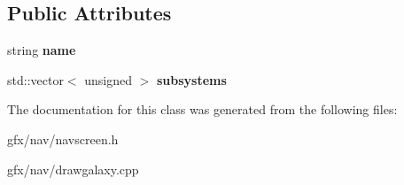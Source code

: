 \subsection*{Public Attributes}
\begin{DoxyCompactItemize}
\item 
string {\bfseries name}\hypertarget{classNavigationSystem_1_1CachedSectorIterator_1_1SectorInfo_a83eb5863d83d07d5b043dc56a3cdbfbf}{}\label{classNavigationSystem_1_1CachedSectorIterator_1_1SectorInfo_a83eb5863d83d07d5b043dc56a3cdbfbf}

\item 
std\+::vector$<$ unsigned $>$ {\bfseries subsystems}\hypertarget{classNavigationSystem_1_1CachedSectorIterator_1_1SectorInfo_a513e1a299362e48e7d2d4150447c647d}{}\label{classNavigationSystem_1_1CachedSectorIterator_1_1SectorInfo_a513e1a299362e48e7d2d4150447c647d}

\end{DoxyCompactItemize}


The documentation for this class was generated from the following files\+:\begin{DoxyCompactItemize}
\item 
gfx/nav/navscreen.\+h\item 
gfx/nav/drawgalaxy.\+cpp\end{DoxyCompactItemize}
